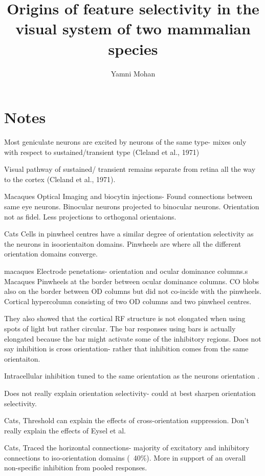 \documentclass {report}
\begin{document}
	

\title{Origins of feature selectivity in the visual system of two mammalian species}%
\author{Yamni Mohan}
\date{}


\section{Notes}
Most geniculate neurons are excited by neurons of the same type- mixes only with respect to sustained/transient type (Cleland et al., 1971)

Visual pathway of sustained/ transient remains separate from retina all the way to the cortex (Cleland et al., 1971).

\cite{Malach1993} Macaques Optical Imaging and biocytin injections- Found connections between same eye neurons. Binocular neurons projected to binocular neurons. Orientation not as fidel. Less projections to orthogonal orientaions.

\cite{Maldonado1997} Cats Cells in pinwheel centres have a similar degree of orientation selectivity as the neurons in isoorientaiton domains. Pinwheels are where all the different orientation domains converge.

\cite{Hubel1969} macaques Electrode penetations- orientation and ocular dominance columns.s
\cite{Bartfeld1992a} Macaques Pinwheels at the border between ocular dominance columns. CO blobs also on the border between OD columns but did not co-incide with the pinwheels. Cortical hypercolumn consisting of two OD columns and two pinwheel centres. 

They also showed that the cortical RF structure is not elongated when using spots of light but rather circular. The bar responses using bars is actually elongated because the bar might activate some of the inhibitory regions. Does not say inhibition is cross orientation- rather that inhibition comes from the same orientaiton. 

Intracellular inhibition tuned to the same orientation as the neurons orientation \cite{Anderson2000}.

Does not really explain orientation selectivity- could at best sharpen orientation selectivity.

\cite{Priebe2006} Cats, Threshold can explain the effects of cross-orientation suppression. Don't really explain the effects of Eysel et al.

\cite{Kisvarday1997} Cats, Traced the horizontal connections- majority of excitatory and inhibitory connections to iso-orientation domains (~40\%). More in support of an overall non-specific inhibition from pooled responses.
\end{document}
